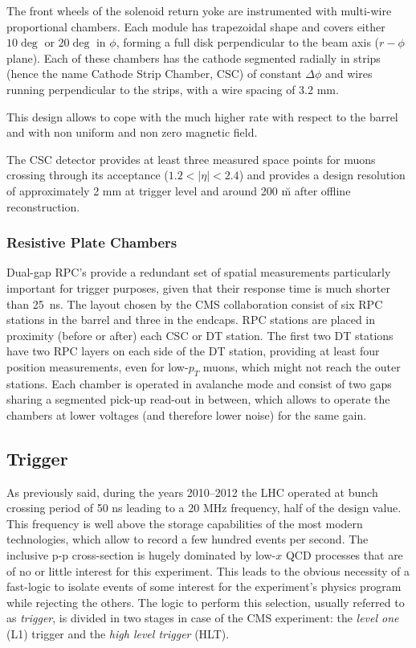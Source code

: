 The front wheels of the solenoid return yoke are instrumented with multi-wire proportional chambers. Each module has trapezoidal shape and covers either $10\deg$ or $20\deg$ in $\phi$, forming a full disk perpendicular to the beam axis ($r-\phi$ plane). Each of these chambers has the cathode segmented radially in strips (hence the name Cathode Strip Chamber, CSC) of constant $\Delta\phi$ and wires running perpendicular to the strips,  with a wire spacing of 3.2 mm. 

This design allows to cope with the much higher rate with respect to the barrel and with non uniform and non zero magnetic field. 

The CSC detector provides at least three measured space points for muons crossing through its acceptance ($1.2 < |\eta| < 2.4$) and provides a design resolution of approximately 2 mm at trigger level and around 200 \u m after offline reconstruction.

\subsubsection*{Resistive Plate Chambers}

Dual-gap RPC's provide a redundant set of spatial measurements particularly important for trigger purposes, given that their response time is much shorter than 25~ns. The layout chosen by the CMS collaboration consist of six RPC stations in the barrel and three in the endcaps. RPC stations are placed in proximity (before or after) each CSC or DT station. The first two DT stations have two RPC layers on each side of the DT station, providing at least four position measurements, even for low-$p_T$ muons, which might not reach the outer stations. Each chamber is operated in avalanche mode and consist of two gaps sharing a segmented pick-up read-out in between, which allows to operate the chambers at lower voltages (and therefore lower noise) for the same gain. 

\subsection{Trigger}

As previously said, during the years 2010--2012 the LHC operated at bunch crossing period of %
50 ns leading to a 20 MHz frequency, half of the design value.
This frequency is well above the storage capabilities of the most modern technologies, which allow to record a few hundred events per second. The inclusive p-p cross-section is hugely dominated by low-$x$ QCD processes that are of no or little interest for this experiment. 
This leads to the obvious necessity of a fast-logic to isolate events of some interest for the experiment's physics program while rejecting the others. 
The logic to perform this selection, usually referred to as \emph{trigger}, is divided in two stages in case of the CMS experiment: the \emph{level one} (L1) trigger and the \emph{high level trigger} (HLT). 

